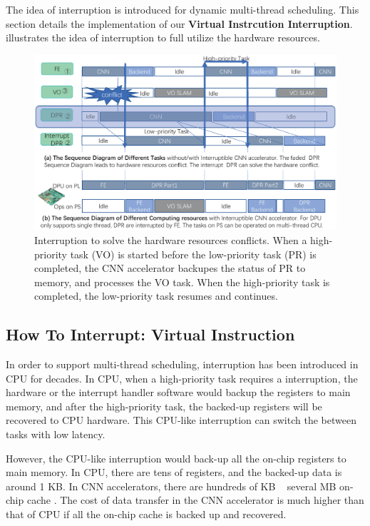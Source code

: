 \label{sec:cnninterrupt}
The idea of interruption is introduced for dynamic multi-thread scheduling. This section details the implementation of our \textbf{Virtual Instrcution Interruption}.  illustrates the idea of interruption to full utilize the hardware resources.


\begin{figure}
	\centering
	\includegraphics[width=0.99\linewidth]{fig/interDPR.eps}
	\caption{Interruption to solve the hardware resources conflicts.  When a high-priority task (VO) is started before the low-priority task (PR) is completed, the CNN accelerator backupes the status of PR to memory, and processes the VO task. When the high-priority task is completed, the low-priority task resumes and continues.
    }
	\label{fig:interDPR}
\end{figure}

\subsection{How To Interrupt: Virtual Instruction}
\label{sec:howinter}

In order to support multi-thread scheduling, interruption has been introduced in CPU for decades. In CPU, when a high-priority task requires a interruption, the hardware or the interrupt handler software would backup the registers to main memory, and after the high-priority task, the backed-up registers will be recovered to CPU hardware. This CPU-like interruption can switch the between tasks with low latency.

However, the CPU-like interruption would back-up all the on-chip registers to main memory. In CPU, there are tens of registers, and the backed-up data is around 1 KB. In CNN accelerators, there are hundreds of KB ~ several MB on-chip cache \cite{qiu2016going, yu2018instruction}. The cost of data transfer in the CNN accelerator is much higher than that of CPU if all the on-chip cache is backed up and recovered.

